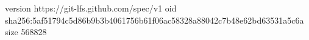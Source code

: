 version https://git-lfs.github.com/spec/v1
oid sha256:5af51794c5d86b9b3b4061756b61f06ac58328a88042c7b48e62bd63531a5c6a
size 568828
